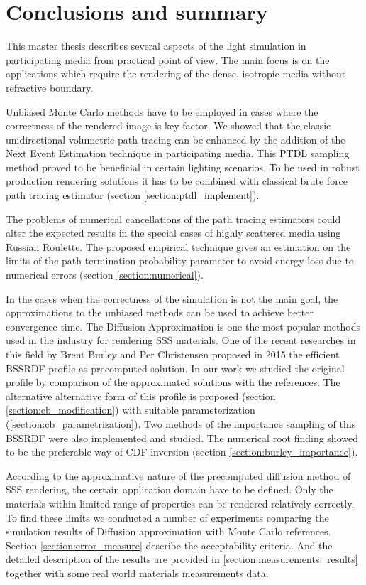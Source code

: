 \chapter{Conclusions and summary}
This master thesis describes several aspects of the light simulation in participating media from
practical point of view. The main focus is on the applications which require the rendering of the
dense, isotropic media without refractive boundary.

Unbiased Monte Carlo methods have to be employed in cases where the correctness of the rendered
image is key factor. We showed that the classic unidirectional volumetric path tracing can be
enhanced by the addition of the Next Event Estimation technique in participating media.
This PTDL sampling method proved to be beneficial in certain lighting scenarios. To be used in
robust production rendering solutions it has to be combined with classical brute force path tracing
estimator (section \ref{section:ptdl_implement}).

The problems of numerical cancellations of the path tracing estimators could alter the expected
results in the special cases of highly scattered media using Russian Roulette.
The proposed empirical technique gives an estimation on the limits of the path termination
probability parameter to avoid energy loss due to numerical errors (section
\ref{section:numerical}).

In the cases when the correctness of the simulation is not the main goal, the approximations to the
unbiased methods can be used to achieve better convergence time. The Diffusion Approximation is one
the most popular methods used in the industry for rendering SSS materials. One of the recent
researches in this field by Brent Burley and Per Christensen proposed in 2015 the efficient BSSRDF
profile as precomputed solution. In our work we studied the original profile by comparison of the
approximated solutions with the references. The alternative alternative form of this profile is
proposed (section \ref{section:cb_modification}) with suitable parameterization
(\ref{section:cb_parametrization}). Two methods of the importance sampling of this BSSRDF were also
implemented and studied. The numerical root finding showed to be the preferable way of CDF inversion
(section \ref{section:burley_importance}).

According to the approximative nature of the precomputed diffusion method of SSS rendering, the
certain application domain have to be defined. Only the materials within limited range of properties
can be rendered relatively correctly. To find these limits we conducted a number of experiments
comparing the simulation results of Diffusion approximation with Monte Carlo references. Section
\ref{section:error_measure} describe the acceptability criteria. And the detailed description of the
results are provided in \ref{section:measurements_results} together with some real world materials
measurements data.
